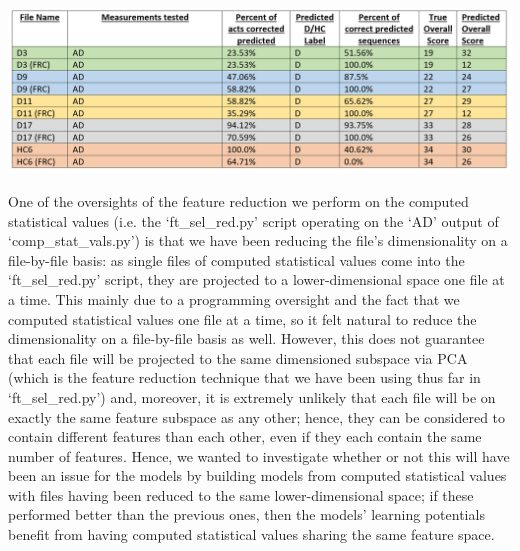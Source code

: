 \documentclass[12pt,twoside]{report}
\begin{document}
\begin{center}
\includegraphics[scale=0.3]{project_figures/fig11_7}
\end{center}

\quad One of the oversights of the feature reduction we perform on the computed statistical values (i.e. the ‘ft\_sel\_red.py’ script operating on the ‘AD’ output of ‘comp\_stat\_vals.py’) is that we have been reducing the file’s dimensionality on a file-by-file basis: as single files of computed statistical values come into the ‘ft\_sel\_red.py’ script, they are projected to a lower-dimensional space one file at a time. This mainly due to a programming oversight and the fact that we computed statistical values one file at a time, so it felt natural to reduce the dimensionality on a file-by-file basis as well. However, this does not guarantee that each file will be projected to the same dimensioned subspace via PCA (which is the feature reduction technique that we have been using thus far in ‘ft\_sel\_red.py’) and, moreover, it is extremely unlikely that each file will be on exactly the same feature subspace as any other; hence, they can be considered to contain different features than each other, even if they each contain the same number of features. Hence, we wanted to investigate whether or not this will have been an issue for the models by building models from computed statistical values with files having been reduced to the same lower-dimensional space; if these performed better than the previous ones, then the models’ learning potentials benefit from having computed statistical values sharing the same feature space.\\
\end{document}
